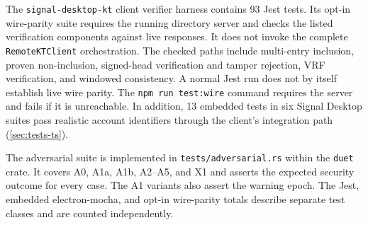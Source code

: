 The \texttt{signal-desktop-kt} client verifier harness contains \num{93} Jest tests. Its opt-in
wire-parity suite requires the running directory server and checks the listed verification
components against live responses. It does not invoke the complete \texttt{RemoteKTClient}
orchestration. The checked paths include multi-entry inclusion, proven
non-inclusion, signed-head verification and tamper rejection, VRF verification, and windowed
consistency. A normal Jest run does not by itself establish live wire parity. The \texttt{npm run
test:wire} command requires the server and fails if it is unreachable. In addition,
\num{13} embedded tests in six Signal Desktop suites pass realistic account identifiers through the
client's integration path (\cref{sec:tests-ts}).

The adversarial suite is implemented in \texttt{tests/adversarial.rs} within the \texttt{duet}
crate. It covers A0, A1a, A1b, A2--A5, and X1 and asserts the expected security outcome for every
case. The A1 variants also assert the warning epoch. The Jest, embedded electron-mocha, and opt-in
wire-parity totals describe separate test classes and are counted independently.
